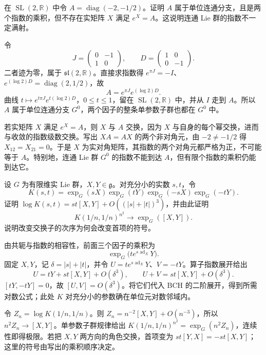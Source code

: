 \begin{exercise}\label{g1:ex:non-surjective-exponential}
	在 \(\operatorname{SL}(2,\mathbb R)\) 中令 \(A=\operatorname{diag}(-2,-1/2)\)。证明 \(A\) 属于单位连通分支，且是两个指数的乘积，但不存在实矩阵 \(X\) 满足 \(e^X=A\)。这说明连通 Lie 群的指数不一定满射。
\end{exercise}
\begin{solution}
	令
	\[
		J=\begin{pmatrix}0&-1\\1&0\end{pmatrix},\qquad D=\begin{pmatrix}1&0\\0&-1\end{pmatrix}.
	\]
	二者迹为零，属于 \(\mathfrak{sl}(2,\mathbb R)\)。直接求指数得 \(e^{\pi J}=-I\)、\(e^{(\log2)D}=\operatorname{diag}(2,1/2)\)，故
	\[
		A=e^{\pi J}e^{(\log2)D}.
	\]
	曲线 \(t\mapsto e^{t\pi J}e^{t(\log2)D}\)，\(0\leq t\leq1\)，留在 \(\operatorname{SL}(2,\mathbb R)\) 中，并从 \(I\) 走到 \(A\)。所以 \(A\) 属于单位连通分支 \(G^0\)，两个因子的整条单参数子群也都在 \(G^0\) 中。

	若实矩阵 \(X\) 满足 \(e^X=A\)，则 \(X\) 与 \(A\) 交换，因为 \(X\) 与自身的每个幂交换，进而与收敛的指数级数交换。写出 \(XA=AX\) 的两个非对角元，由 \(-2\ne-1/2\) 得 \(X_{12}=X_{21}=0\)。于是 \(X\) 为实对角矩阵，其指数的两个对角元都严格为正，不可能等于 \(A\)。特别地，连通 Lie 群 \(G^0\) 的指数不能到达 \(A\)，但有限个指数的乘积仍能到达它。
\end{solution}

\begin{exercise}\label{g1:ex:commutator-exponential-limit}
	设 \(G\) 为有限维实 Lie 群，\(X,Y\in\mathfrak g\)。对充分小的实数 \(s,t\)，令
	\[
		K(s,t)=\exp_G(sX)\exp_G(tY)\exp_G(-sX)\exp_G(-tY).
	\]
	证明 \(\log K(s,t)=st[X,Y]+O((|s|+|t|)^3)\)，并由此证明
	\[
		K(1/n,1/n)^{n^2}\longrightarrow\exp_G([X,Y]).
	\]
	说明改变交换子的次序为何会改变首项的符号。
\end{exercise}
\begin{solution}
	由共轭与指数的相容性，前面三个因子的乘积为
	\[
		\exp_G\bigl(t e^{s\operatorname{ad}_X}Y\bigr).
	\]
	固定 \(X,Y\)，记 \(\delta=|s|+|t|\)，并令 \(U=t e^{s\operatorname{ad}_X}Y\)、\(V=-tY\)。算子指数展开给出
	\[
		U=tY+st[X,Y]+O(\delta^3),\qquad U+V=st[X,Y]+O(\delta^3).
	\]
	\([tY,-tY]=0\)，故 \([U,V]=O(\delta^3)\)。将它们代入 BCH 的二阶展开，得到所需对数公式；此处 \(K\) 对充分小的参数确在单位元对数邻域内。

	令 \(Z_n=\log K(1/n,1/n)\)。则 \(Z_n=n^{-2}[X,Y]+O(n^{-3})\)，所以 \(n^2Z_n\to[X,Y]\)。单参数子群规律给出 \(K(1/n,1/n)^{n^2}=\exp_G(n^2Z_n)\)，连续性即得极限。若把 \(X,Y\) 两方向的角色交换，首项变为 \(st[Y,X]=-st[X,Y]\)；这里的符号由写出的乘积顺序决定。
\end{solution}

